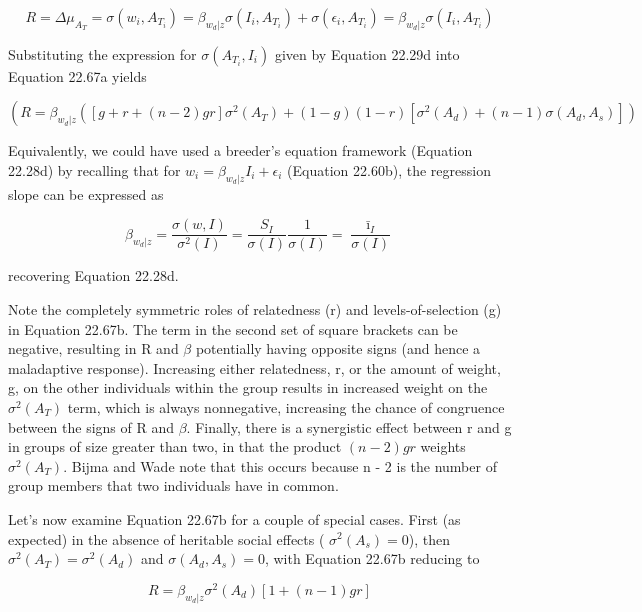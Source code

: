 \documentclass{article}
\begin{document}
\begin{equation}
R=\Delta\mu_{A_{T}}=\sigma(w_{i},A_{T_{i}})=\beta_{w_{d}|z}\sigma(I_{i},A_{T_{i}})+\sigma(\epsilon_{i},A_{T_{i}})=\beta_{w_{d}|z}\sigma(I_{i},A_{T_{i}})
\tag{22.67a}
\label{eq:22_67a}
\end{equation}

Substituting the expression for  $ \sigma(A_{T_i}, I_i) $ given by Equation 22.29d into Equation 22.67a yields

\begin{equation}
\left(R=\beta_{w_{d}|z}\left(\left[g+r+(n-2)g r\right]\sigma^{2}(A_{T})+(1-g)(1-r)\left[\sigma^{2}(A_{d})+(n-1)\sigma(A_{d},A_{s})\right]\right)\right.
\tag{22.67b}
\label{eq:22_67b}
\end{equation}

Equivalently, we could have used a breeder’s equation framework (Equation 22.28d) by recalling that for  $ w_i = \beta_{w_d|z} I_i + \epsilon_i $ (Equation 22.60b), the regression slope can be expressed as

\begin{equation}
\beta_{w_{d}|z}=\frac{\sigma(w,I)}{\sigma^{2}(I)}=\frac{S_{I}}{\sigma(I)}\frac{1}{\sigma(I)}=\frac{\bar{\imath}_{I}}{\sigma(I)}
\end{equation}

recovering Equation 22.28d.

Note the completely symmetric roles of relatedness (r) and levels-of-selection (g) in Equation 22.67b. The term in the second set of square brackets can be negative, resulting in R and  $ \beta $ potentially having opposite signs (and hence a maladaptive response). Increasing either relatedness, r, or the amount of weight, g, on the other individuals within the group results in increased weight on the  $ \sigma^{2}(A_{T}) $ term, which is always nonnegative, increasing the chance of congruence between the signs of R and  $ \beta $. Finally, there is a synergistic effect between r and g in groups of size greater than two, in that the product  $ (n - 2)gr $ weights  $ \sigma^{2}(A_{T}) $. Bijma and Wade note that this occurs because n - 2 is the number of group members that two individuals have in common.

Let's now examine Equation 22.67b for a couple of special cases. First (as expected) in the absence of heritable social effects ( $ \sigma^{2}(A_{s})=0 $), then  $ \sigma^{2}(A_{T})=\sigma^{2}(A_{d}) $ and  $ \sigma(A_{d},A_{s})=0 $, with Equation 22.67b reducing to

\begin{equation}
R=\beta_{w_{d}|z}\sigma^{2}(A_{d})\left[1+(n-1)g r\right]
\end{equation}
\end{document}
